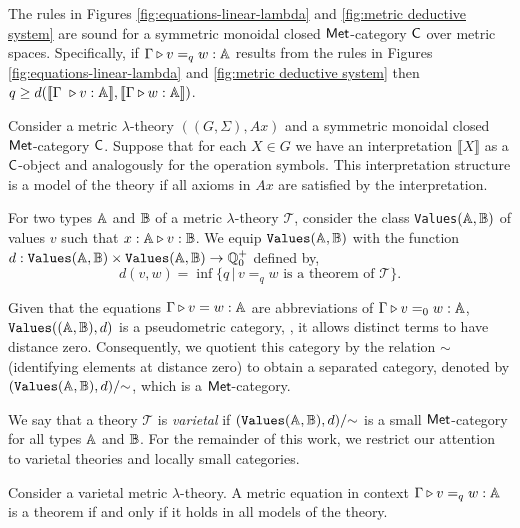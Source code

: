 \begin{theorem} [Soundness] \cite[Theorem 3.14]{dahlqvist2023syntactic}  \label{thm:soundness_metric_no_cond}
  The rules in Figures \ref{fig:equations-linear-lambda} and \ref{fig:metric deductive system} are sound for a  symmetric monoidal closed $\mathsf{Met}$-category  $\mathsf{C}$ over metric spaces. Specifically, if $\Gamma \triangleright v =_{q} w : \mathbb{A} $ results from the rules in Figures \ref{fig:equations-linear-lambda} and \ref{fig:metric deductive system} then $q \geq d( \llbracket \Gamma  \vljud v : \typeA \rrbracket, \llbracket\Gamma \vljud w : \typeA \rrbracket)$.
\end{theorem}


\begin{definition} \label{def:model_metric_no_cond}
  Consider a metric $\lambda$-theory $((G,\Sigma),Ax)$ and a symmetric monoidal closed $\mathsf{Met}$-category $\mathsf{C}$. Suppose that for each $X \in G$ we have an interpretation $\llbracket X \rrbracket$ as a $\mathsf{C}$-object and analogously for the operation symbols. This interpretation structure is a model of the theory if all axioms in $Ax$ are satisfied by the interpretation.
\end{definition}


For two types $\mathbb{A}$ and $\mathbb{B}$ of a metric $\lambda$-theory $\mathscr{T}$, consider the class \texttt{Values}$(\mathbb{A},\mathbb{B})$ of values $v$ such that $x : \mathbb{A} \triangleright v : \mathbb{B}$. We equip $\texttt{Values}(\mathbb{A},\mathbb{B})$ with the function $d :\texttt{Values}(\mathbb{A},\mathbb{B}) \times \texttt{Values}(\mathbb{A},\mathbb{B}) \rightarrow \mathbb{Q}^{+}_0$ defined by,
$$d(v,w)=\inf{\{q \, \vert \, v=_q w \text{ is a theorem of } \mathscr{T} \}}.$$


Given that the equations $\Gamma \triangleright v = w : \mathbb{A}$ are abbreviations of $\Gamma \triangleright v =_0 w : \mathbb{A}$, $\texttt{Values}((\mathbb{A},\mathbb{B}), d)$ is a pseudometric category, \ie, it allows distinct terms to have distance zero. Consequently, we quotient this category by the relation $\sim$ (identifying elements at distance zero) to obtain a separated category, denoted by $(\texttt{Values}(\mathbb{A}, \mathbb{B}), d)/{\sim}$, which is a $\mathsf{Met}$-category.

We say that a theory $\mathscr{T}$ is \emph{varietal} if $(\texttt{Values}(\mathbb{A}, \mathbb{B}), d)/{\sim}$ is a small $\mathsf{Met}$-category for all types $\mathbb{A}$ and $\mathbb{B}$. For the remainder of this work, we restrict our attention to varietal theories and locally small categories.

\begin{theorem}[Completeness] \cite[Theorem 3.16]{dahlqvist2023syntactic} \label{thm:completeness_metric_no_cond}
Consider a varietal metric $\lambda$-theory. A metric equation in context
$\Gamma \triangleright v =_{q} w : \mathbb{A}$
is a theorem if and only if it holds in all models of the theory.
\end{theorem}


